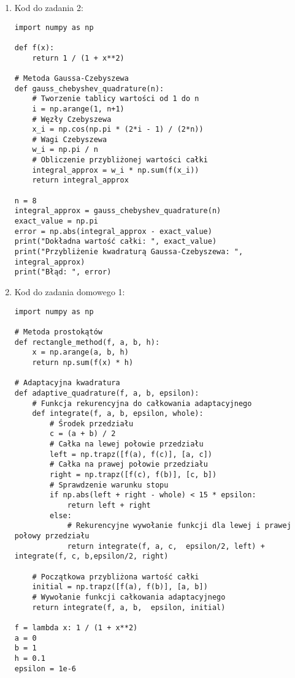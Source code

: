 \documentclass[10pt]{article}
\begin{document}
\begin{adjustwidth}{-1.5cm}{-1.5cm}
\begin{enumerate}
\begin{verbatim}
\end{verbatim}
\newpage
\item Kod do zadania 2:

\begin{verbatim}
import numpy as np

def f(x):
    return 1 / (1 + x**2) 

# Metoda Gaussa-Czebyszewa
def gauss_chebyshev_quadrature(n):  
    # Tworzenie tablicy wartości od 1 do n
    i = np.arange(1, n+1)  
    # Węzły Czebyszewa
    x_i = np.cos(np.pi * (2*i - 1) / (2*n))  
    # Wagi Czebyszewa
    w_i = np.pi / n  
    # Obliczenie przybliżonej wartości całki
    integral_approx = w_i * np.sum(f(x_i))  
    return integral_approx 

n = 8  
integral_approx = gauss_chebyshev_quadrature(n)  
exact_value = np.pi  
error = np.abs(integral_approx - exact_value) 
print("Dokładna wartość całki: ", exact_value)  
print("Przybliżenie kwadraturą Gaussa-Czebyszewa: ", integral_approx)  
print("Błąd: ", error)  

\end{verbatim}

\item Kod do zadania domowego 1:

\begin{verbatim}
import numpy as np

# Metoda prostokątów
def rectangle_method(f, a, b, h):
    x = np.arange(a, b, h) 
    return np.sum(f(x) * h)  

# Adaptacyjna kwadratura
def adaptive_quadrature(f, a, b, epsilon): 
    # Funkcja rekurencyjna do całkowania adaptacyjnego
    def integrate(f, a, b, epsilon, whole):  
        # Środek przedziału
        c = (a + b) / 2  
        # Całka na lewej połowie przedziału
        left = np.trapz([f(a), f(c)], [a, c])  
        # Całka na prawej połowie przedziału
        right = np.trapz([f(c), f(b)], [c, b])  
        # Sprawdzenie warunku stopu
        if np.abs(left + right - whole) < 15 * epsilon:  
            return left + right  
        else:
            # Rekurencyjne wywołanie funkcji dla lewej i prawej połowy przedziału
            return integrate(f, a, c,  epsilon/2, left) + integrate(f, c, b,epsilon/2, right)  

    # Początkowa przybliżona wartość całki
    initial = np.trapz([f(a), f(b)], [a, b]) 
    # Wywołanie funkcji całkowania adaptacyjnego 
    return integrate(f, a, b,  epsilon, initial)  

f = lambda x: 1 / (1 + x**2)  
a = 0  
b = 1  
h = 0.1 
epsilon = 1e-6  


\end{verbatim}
\end{enumerate}
\end{adjustwidth}
\end{document}
